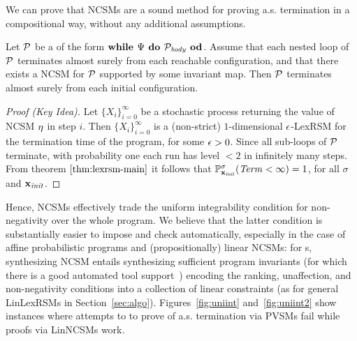 We can prove that NCSMs are a sound method for proving a.s. termination in a compositional way, without any additional assumptions.

\begin{theorem}
\label{thm:nonneg-comp}
Let $\mathcal{P}$ be a \PP{} of the form $\textbf{while } \Psi \textbf{ do } 
\mathcal{P}_{\mathit{body}} \textbf{ od}$. Assume that each nested loop of $\mathcal{P}$ 
terminates almost surely from each reachable configuration, and that there 
exists a NCSM for $\mathcal{P}$ supported by some invariant map. Then $\mathcal{P}$ 
terminates almost surely from each initial configuration.
\end{theorem}
\begin{proof}[Proof (Key Idea)]
Let $\{X_i\}_{i=0}^{\infty}$ be a stochastic process returning the value of 
NCSM $\eta$ in step $i$. Then $\{X_i\}_{i=0}^{\infty}$ is a (non-strict) $1$-dimensional $\epsilon$-LexRSM for the termination time of the program, for some $\epsilon>0$. Since all sub-loops of $\mathcal{P}$ terminate, with probability one each run has level $<2$ in infinitely many steps. From theorem $\ref{thm:lexrsm-main}$ it follows that $\mathbb{P}^\sigma_{\mathbf{x}_{\mathit{init}}}(\mathit{Term}<\infty)=1$, for all $\sigma$ and $\mathbf{x}_{\mathit{init}}$.
\end{proof}

Hence, NCSMs effectively trade the uniform integrability condition for 
non-negativity over the whole program. We believe that the latter condition is 
substantially easier to impose and check automatically, especially in the case 
of affine probabilistic programs and (propositionally) linear NCSMs: for 
\APP{}s, synthesizing NCSM entails synthesizing sufficient program invariants 
(for which there is a good automated tool support~\cite{FG10:aspic})  encoding 
the ranking, 
unaffection, and non-negativity conditions into a collection of linear 
constraints (as for general LinLexRSMs in Section~\ref{sec:algo}). 
Figures~\ref{fig:uniint} and~\ref{fig:uniint2} show instances where attempts to 
to prove of a.s. termination via PVSMs fail while proofs via LinNCSMs work. 


